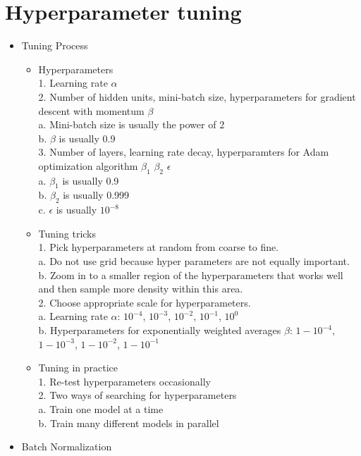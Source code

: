 \section{Hyperparameter tuning}
\begin{itemize}
    \item Tuning Process
    \begin{itemize}
        \item Hyperparameters\\
1. Learning rate $\alpha$\\
2. Number of hidden units, mini-batch size, hyperparameters for gradient descent with momentum $\beta$\\
\tab a. Mini-batch size is usually the power of 2\\
\tab b. $\beta$ is usually 0.9\\
3. Number of layers, learning rate decay, hyperparamters for Adam optimization algorithm $\beta_{1}$ $\beta_{2}$ $\epsilon$\\
\tab a. $\beta_{1}$ is usually 0.9\\
\tab b. $\beta_{2}$ is usually 0.999\\
\tab c. $\epsilon$ is usually $10^{-8}$
        \item Tuning tricks\\
1. Pick hyperparameters at random from coarse to fine.\\
\tab a. Do not use grid because hyper parameters are not equally important.\\
\tab b. Zoom in to a smaller region of the hyperparameters that works well and then sample more density within this area.\\
2. Choose appropriate scale for hyperparameters.\\
\tab a. Learning rate $\alpha$: $10^{-4}$, $10^{-3}$, $10^{-2}$, $10^{-1}$, $10^{0}$\\
\tab b. Hyperparameters for exponentially weighted averages $\beta$: $1 - 10^{-4}$, $1 - 10^{-3}$, $1 - 10^{-2}$, $1 - 10^{-1}$
        \item Tuning in practice\\
1. Re-test hyperparameters occasionally\\
2. Two ways of searching for hyperparameters\\
\tab a. Train one model at a time\\
\tab b. Train many different models in parallel\\
    \end{itemize}
    \item Batch Normalization

\end{itemize}
